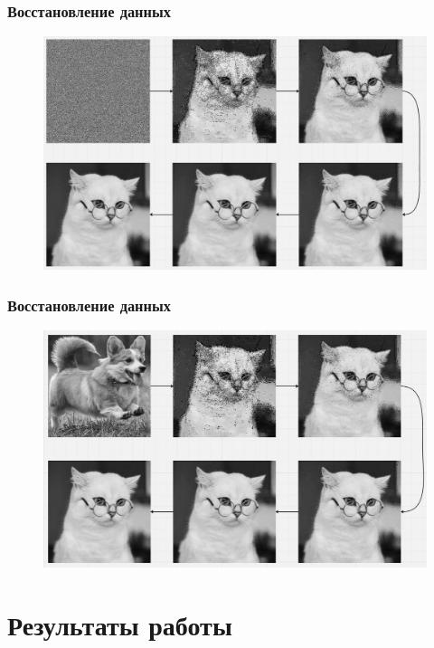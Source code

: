 \documentclass[t aspectratio=169]{beamer}
\begin{document}
  \begin{frame}\frametitle{Восстановление данных}
    \begin{figure}
      \begin{center}
        \includegraphics[width=\textwidth]{./images/cat_stages.jpg}
      \end{center}
    \end{figure}
  \end{frame}

  \begin{frame}\frametitle{Восстановление данных}
    \begin{figure}
      \begin{center}
        \includegraphics[width=\textwidth]{./images/cat_stages_dog.jpg}
      \end{center}
    \end{figure}
  \end{frame}


  \section{Результаты работы}
\end{document}
